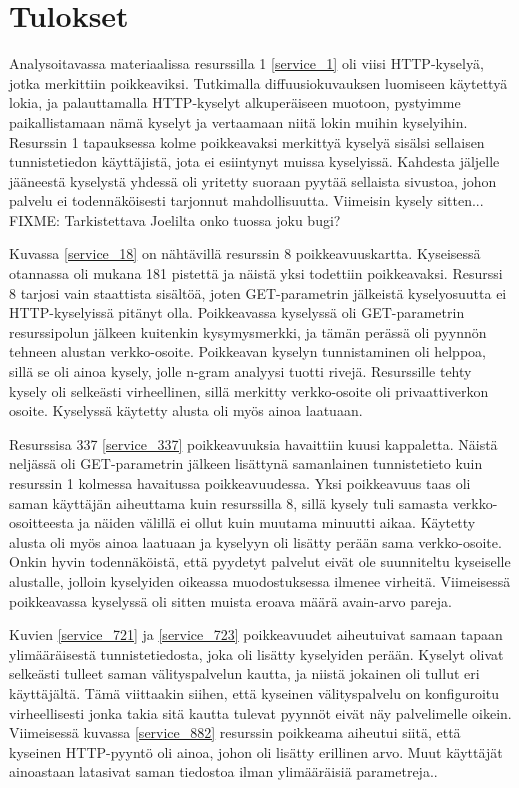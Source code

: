 \section{Tulokset}

Analysoitavassa materiaalissa resurssilla 1 \ref{service_1} oli viisi HTTP-kyselyä, jotka merkittiin poikkeaviksi. Tutkimalla diffuusiokuvauksen
luomiseen käytettyä lokia, ja palauttamalla HTTP-kyselyt alkuperäiseen muotoon, pystyimme paikallistamaan nämä kyselyt ja vertaamaan niitä lokin
muihin kyselyihin. Resurssin 1 tapauksessa kolme poikkeavaksi merkittyä kyselyä sisälsi sellaisen tunnistetiedon käyttäjistä, jota ei esiintynyt 
muissa kyselyissä. Kahdesta jäljelle jääneestä kyselystä yhdessä oli yritetty suoraan pyytää sellaista sivustoa, johon palvelu ei todennäköisesti
tarjonnut mahdollisuutta. Viimeisin kysely sitten... FIXME: Tarkistettava Joelilta onko tuossa joku bugi?

Kuvassa \ref{service_18} on nähtävillä resurssin 8 poikkeavuuskartta. Kyseisessä otannassa oli mukana 181 pistettä ja näistä yksi todettiin poikkeavaksi.
Resurssi 8 tarjosi vain staattista sisältöä, joten GET-parametrin jälkeistä kyselyosuutta ei HTTP-kyselyissä pitänyt olla. Poikkeavassa kyselyssä oli
GET-parametrin resurssipolun jälkeen kuitenkin kysymysmerkki, ja tämän perässä oli pyynnön tehneen alustan verkko-osoite. Poikkeavan kyselyn tunnistaminen
oli helppoa, sillä se oli ainoa kysely, jolle n-gram analyysi tuotti rivejä. Resurssille tehty kysely oli selkeästi virheellinen, sillä merkitty verkko-osoite 
oli privaattiverkon osoite. Kyselyssä käytetty alusta oli myös ainoa laatuaan.

Resurssisa 337 \ref{service_337} poikkeavuuksia havaittiin kuusi kappaletta. Näistä neljässä oli GET-parametrin jälkeen lisättynä samanlainen tunnistetieto
kuin resurssin 1 kolmessa havaitussa poikkeavuudessa. Yksi poikkeavuus taas oli saman käyttäjän aiheuttama kuin resurssilla 8, sillä kysely tuli samasta
verkko-osoitteesta ja näiden välillä ei ollut kuin muutama minuutti aikaa. Käytetty alusta oli myös ainoa laatuaan ja kyselyyn oli lisätty perään
sama verkko-osoite. Onkin hyvin todennäköistä, että pyydetyt palvelut eivät ole suunniteltu kyseiselle alustalle, jolloin kyselyiden oikeassa muodostuksessa ilmenee
virheitä. Viimeisessä poikkeavassa kyselyssä oli sitten muista eroava määrä avain-arvo pareja.

Kuvien \ref{service_721} ja \ref{service_723} poikkeavuudet aiheutuivat samaan tapaan ylimääräisestä tunnistetiedosta, joka oli lisätty kyselyiden perään. Kyselyt olivat selkeästi tulleet
saman välityspalvelun kautta, ja niistä jokainen oli tullut eri käyttäjältä. Tämä viittaakin siihen, että kyseinen välityspalvelu on konfiguroitu virheellisesti jonka
takia sitä kautta tulevat pyynnöt eivät näy palvelimelle oikein. Viimeisessä kuvassa \ref{service_882} resurssin poikkeama aiheutui siitä, että kyseinen HTTP-pyyntö oli ainoa, johon oli lisätty erillinen arvo. 
Muut käyttäjät ainoastaan latasivat saman tiedostoa ilman ylimääräisiä parametreja.. 



